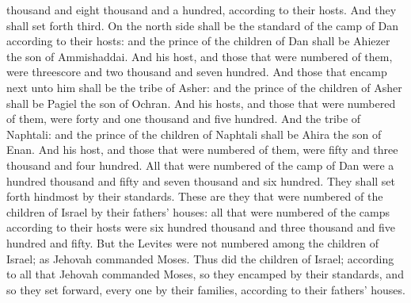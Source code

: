 thousand and eight thousand and a hundred, according to their hosts. And they shall set forth third.  On the north side shall be the standard of the camp of Dan according to their hosts: and the prince of the children of Dan shall be Ahiezer the son of Ammishaddai. And his host, and those that were numbered of them, were threescore and two thousand and seven hundred. And those that encamp next unto him shall be the tribe of Asher: and the prince of the children of Asher shall be Pagiel the son of Ochran. And his hosts, and those that were numbered of them, were forty and one thousand and five hundred. And the tribe of Naphtali: and the prince of the children of Naphtali shall be Ahira the son of Enan. And his host, and those that were numbered of them, were fifty and three thousand and four hundred. All that were numbered of the camp of Dan were a hundred thousand and fifty and seven thousand and six hundred. They shall set forth hindmost by their standards.  These are they that were numbered of the children of Israel by their fathers’ houses: all that were numbered of the camps according to their hosts were six hundred thousand and three thousand and five hundred and fifty. But the Levites were not numbered among the children of Israel; as Jehovah commanded Moses. Thus did the children of Israel; according to all that Jehovah commanded Moses, so they encamped by their standards, and so they set forward, every one by their families, according to their fathers’ houses. 

